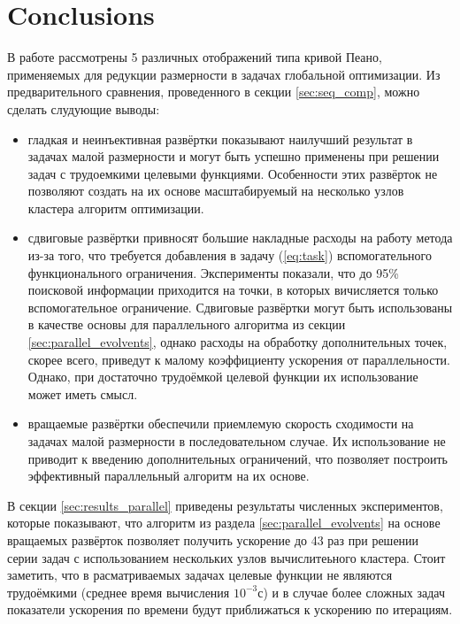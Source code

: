 \documentclass[runningheads]{llncs}
\begin{document}
\section{Conclusions}
В работе рассмотрены 5 различных отображений типа кривой Пеано, применяемых для редукции размерности в задачах глобальной оптимизации.
Из предварительного сравнения, проведенного в секции \ref{sec:seq_comp}, можно сделать слудующие выводы:
\begin{itemize}
  \item гладкая и неинъективная развёртки показывают наилучший результат в задачах малой размерности и могут быть успешно применены при решении задач с трудоемкими целевыми функциями. Особенности этих развёрток не позволяют создать на их основе масштабируемый на несколько узлов кластера алгоритм оптимизации.
  \item сдвиговые развёртки привносят большие накладные расходы на работу метода из-за того, что требуется добавления в задачу (\ref{eq:task}) вспомогательного функционального ограничения. Эксперименты показали, что до 95\% поисковой информации приходится на точки, в которых вичисляется только вспомогательное ограничение. Сдвиговые развёртки могут быть использованы в качестве основы для параллельного алгоритма из секции \ref{sec:parallel_evolvents}, однако расходы на обработку дополнительных точек, скорее всего, приведут к малому коэффициенту ускорения от параллельности. Однако, при достаточно трудоёмкой целевой функции их использование может иметь смысл.
  \item вращаемые развёртки обеспечили приемлемую скорость сходимости на задачах малой размерности в последовательном случае. Их использование не приводит к введению дополнительных ограничений, что позволяет построить эффективный параллельный алгоритм на их основе.
\end{itemize}

В секции \ref{sec:results_parallel} приведены результаты численных экспериментов, которые показывают, что алгоритм из раздела \ref{sec:parallel_evolvents} на основе вращаемых развёрток позволяет получить ускорение до 43 раз при решении серии задач с использованием нескольких узлов вычислитеьного кластера. Стоит заметить, что в расматриваемых задачах целевые функции не являются трудоёмкими (среднее время вычисления $10^{-3}$с) и в случае более сложных задач показатели ускорения по времени будут приближаться к ускорению по итерациям. 
\end{document}
